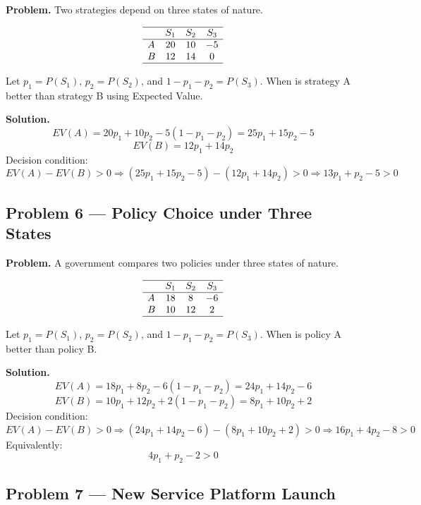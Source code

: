 \begin{ExamProblems}
		\textbf{Problem.}
		Two strategies depend on three states of nature.
		
		\[
		\begin{array}{lccc}
		\hline
		 & S_1 & S_2 & S_3 \\
		\hline
		A & 20 & 10 & -5 \\
		B & 12 & 14 & 0 \\
		\hline
		\end{array}
		\]
		
		Let \(p_1=P(S_1)\), \(p_2=P(S_2)\), and \(1-p_1-p_2=P(S_3)\).  
		When is strategy A better than strategy B using Expected Value.
		
		\textbf{Solution.}
		\[
		EV(A)=20p_1+10p_2-5(1-p_1-p_2)=25p_1+15p_2-5
		\]
		\[
		EV(B)=12p_1+14p_2
		\]
		Decision condition:
		\[
		EV(A)-EV(B)>0
		\Rightarrow (25p_1+15p_2-5)-(12p_1+14p_2)>0
		\Rightarrow 13p_1+p_2-5>0
		\]
		
		\hypertarget{c7-ex6}{}
		\item
		\subsection*{Problem 6 — Policy Choice under Three States}
		
		\textbf{Problem.}
		A government compares two policies under three states of nature.
		
		\[
		\begin{array}{lccc}
		\hline
		 & S_1 & S_2 & S_3 \\
		\hline
		A & 18 & 8 & -6 \\
		B & 10 & 12 & 2 \\
		\hline
		\end{array}
		\]
		
		Let \(p_1=P(S_1)\), \(p_2=P(S_2)\), and \(1-p_1-p_2=P(S_3)\).  
		When is policy A better than policy B.
		
		\textbf{Solution.}
		\[
		EV(A)=18p_1+8p_2-6(1-p_1-p_2)=24p_1+14p_2-6
		\]
		\[
		EV(B)=10p_1+12p_2+2(1-p_1-p_2)=8p_1+10p_2+2
		\]
		Decision condition:
		\[
		EV(A)-EV(B)>0
		\Rightarrow (24p_1+14p_2-6)-(8p_1+10p_2+2)>0
		\Rightarrow 16p_1+4p_2-8>0
		\]
		Equivalently:
		\[
		4p_1+p_2-2>0
		\]
		
		\hypertarget{c7-ex7}{}
		\item
		\subsection*{Problem 7 — New Service Platform Launch}
		

\end{ExamProblems}
